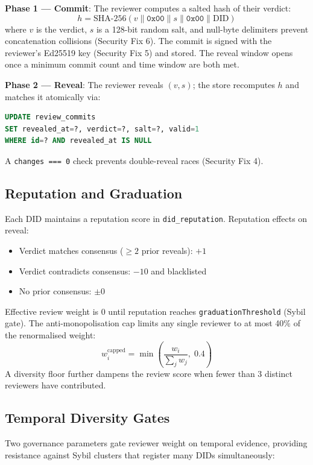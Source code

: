 \documentclass[10pt,twocolumn]{article}
\begin{document}
\textbf{Phase 1 — Commit}: The reviewer computes a salted hash of their
verdict:
\[
  h = \text{SHA-256}(v \| \texttt{0x00} \| s \| \texttt{0x00} \| \text{DID})
\]
where $v$ is the verdict, $s$ is a 128-bit random salt, and null-byte
delimiters prevent concatenation collisions (Security Fix 6). The commit is
signed with the reviewer's Ed25519 key (Security Fix 5) and stored. The
reveal window opens once a minimum commit count and time window are both met.

\textbf{Phase 2 — Reveal}: The reviewer reveals $(v, s)$; the store recomputes
$h$ and matches it atomically via:
\begin{lstlisting}[language=SQL]
UPDATE review_commits
SET revealed_at=?, verdict=?, salt=?, valid=1
WHERE id=? AND revealed_at IS NULL
\end{lstlisting}
A \texttt{changes === 0} check prevents double-reveal races (Security Fix 4).

\subsection{Reputation and Graduation}

Each DID maintains a reputation score in \texttt{did\_reputation}. Reputation
effects on reveal:

\begin{itemize}[noitemsep,topsep=2pt]
  \item Verdict matches consensus ($\geq 2$ prior reveals): $+1$
  \item Verdict contradicts consensus: $-10$ and blacklisted
  \item No prior consensus: $\pm 0$
\end{itemize}

Effective review weight is 0 until reputation reaches
\texttt{graduationThreshold} (Sybil gate). The anti-monopolisation cap limits
any single reviewer to at most 40\% of the renormalised weight:
\[
  w_i^{\text{capped}} = \min\!\left(\frac{w_i}{\sum_j w_j},\; 0.4\right)
\]
A diversity floor further dampens the review score when fewer than 3 distinct
reviewers have contributed.

\subsection{Temporal Diversity Gates}

Two governance parameters gate reviewer weight on temporal evidence, providing
resistance against Sybil clusters that register many DIDs simultaneously:
\end{document}

